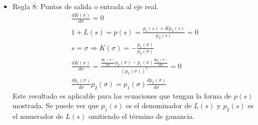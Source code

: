 \begin{itemize}
\begin{align*}
  \end{align*}
  \item Regla 8: Puntos de salida o entrada al eje real.
  \begin{align*}
    \frac{dK(\sigma)}{d\sigma} = 0
    \\
    1+L(s) = p(s) = \frac{p_1(s) + K p_2(s)}{p_3(s)} = 0
    \\
    s=\sigma \Rightarrow K(\sigma) = -\frac{p_1(\sigma)}{p_2(\sigma)}
    \\
    \frac{dK(\sigma)}{d\sigma} = 
    \frac{
      \frac{dp_1(\sigma)}{d\sigma} p_2(\sigma) 
      - p_1(\sigma) \frac{dp_2(\sigma)}{d\sigma}
    }{
      (p_2(\sigma))^2
    } = 0
    \\
    \frac{dp_1(\sigma)}{d\sigma} p_2(\sigma) = p_1(\sigma) \frac{dp_2(\sigma)}{d\sigma}
  \end{align*}  
  Este resultado es aplicable para las ecuaciones que tengan la forma de $p(s)$ mostrada. Se puede ver que $p_1(s)$ es el denominador de $L(s)$ y $p_2(s)$ es el numerador de $L(s)$ omitiendo el término de ganancia.


\end{itemize}
